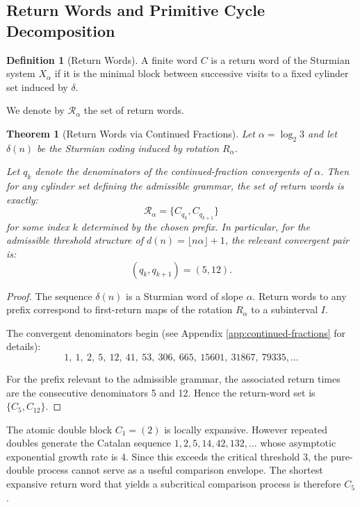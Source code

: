 \documentclass[12pt, oneside]{article}
\numberwithin{equation}{section}
\theoremstyle{definition}
\newtheorem{definition}{Definition}[section]
\theoremstyle{plain}
\newtheorem{theorem}{Theorem}[section]
\theoremstyle{remark}
\begin{document}

\subsection{Return Words and Primitive Cycle Decomposition}

\begin{definition}[Return Words]
A finite word $C$ is a return word of the Sturmian system $X_\alpha$
if it is the minimal block between successive visits to a fixed cylinder
set induced by $\delta$.

We denote by $\mathcal{R}_\alpha$ the set of return words.
\end{definition}

\begin{theorem}[Return Words via Continued Fractions]
Let $\alpha = \log_2 3$ and let $\delta(n)$ be the Sturmian coding induced
by rotation $R_\alpha$.

Let $q_k$ denote the denominators of the continued-fraction convergents of $\alpha$.
Then for any cylinder set defining the admissible grammar, the set of return
words is exactly:
\[
\mathcal{R}_\alpha = \{C_{q_k}, C_{q_{k+1}}\}
\]
for some index $k$ determined by the chosen prefix.  In particular, for the admissible
threshold structure of $d(n)=\lfloor n\alpha \rfloor +1$, the relevant convergent pair is:
\[
(q_k, q_{k+1}) = (5,12).
\]
\end{theorem}

\begin{proof}
The sequence $\delta(n)$ is a Sturmian word of slope $\alpha$.
Return words to any prefix correspond to first-return maps of the rotation
$R_\alpha$ to a subinterval $I$.

The convergent denominators begin (see Appendix \ref{app:continued-fractions} for details):
\[
1,\ 1,\ 2,\ 5,\ 12,\ 41,\ 53,\ 306,\ 665,\ 15601,\ 31867,\ 79335,\ldots
\]

For the prefix relevant to the admissible grammar, the associated return times are the
consecutive denominators 5 and 12. Hence the return-word set is $\{C_5, C_{12}\}$.
\end{proof}

The atomic double block $C_1=(2)$ is locally expansive. However repeated doubles generate the
Catalan sequence $1,2,5,14,42,132,\ldots$ whose asymptotic exponential growth rate is 4. Since this
exceeds the critical threshold 3, the pure-double process cannot serve as a useful comparison envelope.
The shortest expansive return word that yields a subcritical comparison process is therefore $C_5$.
\end{document}
